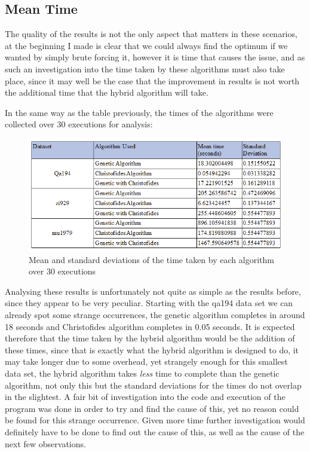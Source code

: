 \documentclass[11pt,a4paper,titlepage]{article}
\begin{document}
\subsection{Mean Time}

The quality of the results is not the only aspect that matters in these scenarios, at the beginning I made is clear that we could always find the optimum if we wanted by simply brute forcing it, however it is time that causes the issue, and as such an investigation into the time taken by these algorithms must also take place, since it may well be the case that the improvement in results is not worth the additional time that the hybrid algorithm will take.

\pagebreak

In the same way as the table previously, the times of the algorithms were collected over 30 executions for analysis: 

\begin{figure}[ht]
	\includegraphics[width=\textwidth]{MeanTime}
	\centering
	\caption{Mean and standard deviations of the time taken by each algorithm over 30 executions}
\end{figure}

Analysing these results is unfortunately not quite as simple as the results before, since they appear to be very peculiar. Starting with the qa194 data set we can already spot some strange occurrences, the genetic algorithm completes in around 18 seconds and Christofides algorithm completes in 0.05 seconds. It is expected therefore that the time taken by the hybrid algorithm would be the addition of these times, since that is exactly what the hybrid algorithm is designed to do, it may take longer due to some overhead, yet strangely enough for this smallest data set, the hybrid algorithm takes \textit{less} time to complete than the genetic algorithm, not only this but the standard deviations for the times do not overlap in the slightest. A fair bit of investigation into the code and execution of the program was done in order to try and find the cause of this, yet no reason could be found for this strange occurrence. Given more time further investigation would definitely have to be done to find out the cause of this, as well as the cause of the next few observations.
\end{document}
